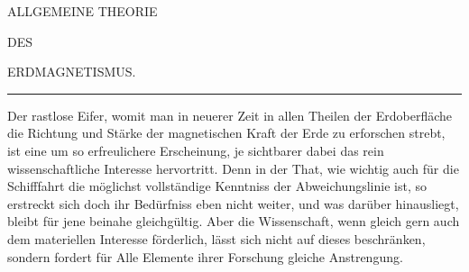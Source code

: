 \newcommand{\GaussVTheoryGathering}[1]{\gdef\GaussVTheoryGatheringText{#1}}
\newcommand{\GaussVTheoryEarlyFolio}[1]{%
  \GaussVTheoryGathering{}%
  \fancypagestyle{GaussVTheory#1}{%
    \fancyhead{}%
    \ifodd#1\relax
      \fancyhead[C]{\small DES ERDMAGNETISMUS\ifnum#1=135\relax\else\ifnum#1=165\relax\else.\fi\fi}%
      \fancyhead[R]{\small #1}%
    \else
      \fancyhead[L]{\small #1}%
      \fancyhead[C]{\small ALLGEMEINE THEORIE}%
    \fi
    \ifnum#1=123\relax
      \fancyfoot[R]{\small 16\textsuperscript{*}\hspace{.18\headwidth}}%
    \else
      \fancyfoot[R]{\small \GaussVTheoryGatheringText\hspace{.10\headwidth}}%
    \fi
    \renewcommand{\headrulewidth}{0pt}%
  }%
  \thispagestyle{GaussVTheory#1}%
}
\thispagestyle{GaussVTheoryOpening}
\renewcommand{\Article}[1]{\par\medskip\Needspace{4\baselineskip}\pdfbookmark[1]{Art. #1}{erdmagnetismus-art-#1}\centerline{\textbf{#1.}}\nobreak\smallskip}
\vspace*{1.38in}
\begin{center}
ALLGEMEINE THEORIE\par\medskip
{\small DES\par}\medskip
{\Large{}ERDMAGNETISMUS.\par}
\medskip
\rule{.09\linewidth}{.35pt}\par
\end{center}
Der rastlose Eifer, womit man in neuerer Zeit in allen Theilen der Erdoberfläche die Richtung und Stärke der magnetischen Kraft der Erde zu erforschen strebt, ist eine um so erfreulichere Erscheinung, je sichtbarer dabei das rein wissenschaftliche Interesse hervortritt. Denn in der That, wie wichtig auch für die Schifffahrt die möglichst vollständige Kenntniss der Abweichungslinie ist, so erstreckt sich doch ihr Bedürfniss eben nicht weiter, und was darüber hinausliegt, bleibt für jene beinahe gleichgültig. Aber die Wissenschaft, wenn gleich gern auch dem materiellen Interesse förderlich, lässt sich nicht auf dieses beschränken, sondern fordert für Alle Elemente ihrer Forschung gleiche Anstrengung.

